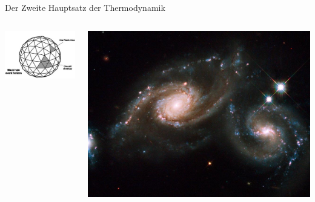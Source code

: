 \documentclass[ngerman,ph]{URbeamer}
\begin{document}
	\begin{frame}{Der Zweite Hauptsatz der Thermodynamik}
		\begin{columns}
			\begin{column}[c]{0.45\textwidth}
			\end{column}
			\begin{column}[c]{0.45\textwidth}
			\end{column}
		\end{columns}
		\vspace{0.3cm}
		\begin{columns}
			\begin{column}[c]{0.45\textwidth}
				\includegraphics[width=\textwidth]{BHentropy1}
			\end{column}
			\begin{column}[c]{0.45\textwidth}
				\hfill
				\includegraphics[width=\textwidth]{kollidierendeSHs}
			\end{column}
		\end{columns}
	\end{frame} %
	
\end{document}
